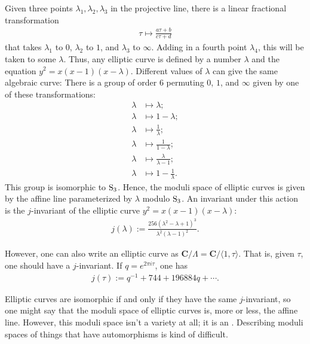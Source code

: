 \documentclass[11pt, oneside,margin=1in]{article}
\begin{document}
Given three points $\lambda_1,\lambda_2,\lambda_3$ in the projective line, there is a linear fractional transformation 
\begin{align*}
	\tau\longmapsto \frac{a\tau+b}{c\tau+d}
\end{align*}
that takes $\lambda_1$ to $0$, $\lambda_2$ to $1$, and $\lambda_3$ to $\infty$. Adding in a fourth point $\lambda_4$, this will be taken to some $\lambda$. Thus, any elliptic curve is defined by a number $\lambda$ and the equation $y^2=x(x-1) (x-\lambda)$. Different values of $\lambda$ can give the same algebraic curve: There is a group of order $6$ permuting $0$, $1$, and $\infty$ given by one of these transformations:
\begin{align*}
	\lambda&\longmapsto\lambda;\\
	\lambda&\longmapsto 1-\lambda;\\
	\lambda&\longmapsto\frac{1}{\lambda};\\
	\lambda&\longmapsto \frac{1}{1-\lambda};\\
	\lambda&\longmapsto \frac{\lambda}{\lambda-1};\\
	\lambda&\longmapsto 1-\frac{1}{\lambda}.
\end{align*}
This group is isomorphic to $\operatorname{S}_3$. Hence, the moduli space of elliptic curves is given by the affine line parameterized by $\lambda$ modulo $\operatorname{S}_3$. An invariant under this action is the $j$-invariant of the elliptic curve $y^2 = x(x-1) (x-\lambda)$:
\begin{align*}
	j(\lambda) := \frac{256(\lambda^2-\lambda+1)^3}{\lambda^2(\lambda-1)^2}.
\end{align*}

However, one can also write an elliptic curve as $\mathbf{C}/\Lambda=\mathbf{C}/\langle 1,\tau\rangle$. That is, given $\tau$, one should have a $j$-invariant. If $q=e^{2\pi i\tau}$, one has
\begin{align*}
	j(\tau) := q ^{-1} + 744 + 196884q + \cdots.
\end{align*}

Elliptic curves are isomorphic if and only if they have the same $j$-invariant, so one might say that the moduli space of elliptic curves is, more or less, the affine line. However, this moduli space isn't a variety at all; it is an . Describing moduli spaces of things that have automorphisms is kind of difficult.
\end{document}
